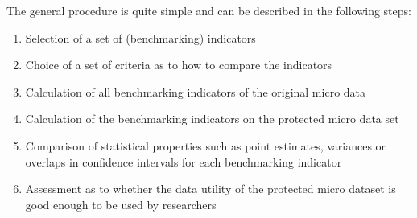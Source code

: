\documentclass[]{article}
\begin{document}
The general procedure is quite
simple and can be described in the following steps:
\begin{enumerate}
\item Selection of a set of (benchmarking) indicators
\item Choice of a set of criteria as to how to compare the indicators
\item Calculation of all benchmarking indicators of the original micro data
\item Calculation of the benchmarking indicators on the protected micro data set
\item Comparison of statistical properties such as point estimates, variances or
overlaps in conﬁdence intervals for each benchmarking indicator
\item Assessment as to whether the data utility of the protected micro dataset is
good enough to be used by researchers
\end{enumerate}
\end{document}
